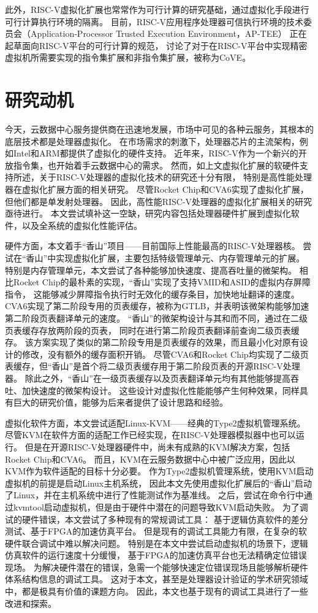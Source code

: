 此外，RISC-V虚拟化扩展也常常作为可行计算的研究基础，通过虚拟化手段进行可行计算执行环境的隔离。
目前，RISC-V应用程序处理器可信执行环境的技术委员会（Application-Processor Trusted Execution Environment，AP-TEE）
正在起草面向RISC-V平台的可行计算的规范，
讨论了对于在RISC-V平台中实现精密虚拟机所需要实现的指令集扩展和非指令集扩展，被称为CoVE\cite{sahita2023cove}。
\section{研究动机}

今天，云数据中心服务提供商在迅速地发展，市场中可见的各种云服务，其根本的底层技术都是处理器虚拟化。
在市场需求的刺激下，处理器芯片的主流架构，例如Intel和ARM都提供了虚拟化的硬件支持。
近年来，RISC-V作为一个新兴的开放指令集，也开始着手云数据中心的需求。
然而，如上文虚拟化扩展的软硬件支持所述，关于RISC-V处理器的虚拟化技术的研究还十分有限，
特别是高性能处理器在虚拟化扩展方面的相关研究。
尽管Rocket Chip和CVA6实现了虚拟化扩展，但他们都是单发射处理器。
因此，高性能RISC-V处理器的虚拟化扩展相关的研究亟待进行。
本文尝试填补这一空缺，研究内容包括处理器硬件扩展到虚拟化软件，以及全系统的虚拟化性能评估。

硬件方面，本文着手“香山”项目——目前国际上性能最高的RISC-V处理器核。
尝试在“香山”中实现虚拟化扩展，主要包括特级管理单元、内存管理单元的扩展。
特别是内存管理单元，本文尝试了各种能够加快速度、提高吞吐量的微架构。
相比Rocket Chip的最朴素的实现，“香山”实现了支持VMID和ASID的虚拟内存屏障指令，
这能够减少屏障指令执行时无效化的缓存条目，加快地址翻译的速度。
CVA6实现了第二阶段专用的页表缓存，被称为GTLB，并表明该微架构能够加速第二阶段页表翻译单元的速度。
“香山”的微架构设计与其和而不同，通过在二级页表缓存存放两阶段的页表，
同时在进行第二阶段页表翻译前查询二级页表缓存。
该方案实现了类似的第二阶段专用是页表缓存的效果，而且最小化对原有设计的修改，没有额外的缓存面积开销。
尽管CVA6和Rocket Chip均实现了二级页表缓存，但“香山”是首个将二级页表缓存用于第二阶段页表的开源RISC-V处理器。
除此之外，“香山”在一级页表缓存以及页表翻译单元均有其他能够提高吞吐、加快速度的微架构设计。
这些设计对虚拟化性能能够产生何种效果，同样具有巨大的研究价值，能够为后来者提供了设计思路和经验。

虚拟化软件方面，本文尝试适配Linux-KVM——经典的Type2虚拟机管理系统。
尽管KVM在软件方面的适配工作已经实现，在RISC-V处理器模拟器中也可以运行。
但是在开源RISC-V处理器硬件中，尚未有成熟的KVM解决方案，包括Rocket Chip和CVA6。
而且，KVM在云服务数据中心中被广泛应用，因此以KVM作为软件适配的目标十分必要。
作为Type2虚拟机管理系统，使用KVM启动虚拟机的前提是启动Linux主机系统，
因此本文先使用虚拟化扩展后的“香山”启动了Linux，并在主机系统中进行了性能测试作为基准线。
之后，尝试在命令行中通过kvmtool启动虚拟机，但是由于硬件中潜在的问题导致KVM启动失败。
为了调试的硬件错误，本文尝试了多种现有的常规调试工具：
基于逻辑仿真软件的差分测试、基于FPGA的加速仿真平台。
但是现有的调试工具能力有限，在复杂的软硬件联合调试中难以解决问题。
特别是在本文中尝试启动虚拟机的场景下，逻辑仿真软件的运行速度十分缓慢，
基于FPGA的加速仿真平台也无法精确定位错误现场。
为解决硬件潜在的错误，急需一个能够快速定位错误现场且能够解析硬件体系结构信息的调试工具。
这对于本文，甚至是处理器设计验证的学术研究领域中，都是极具有价值的课题方向。
因此，本文也基于现有的调试工具进行了一些改进和探索。